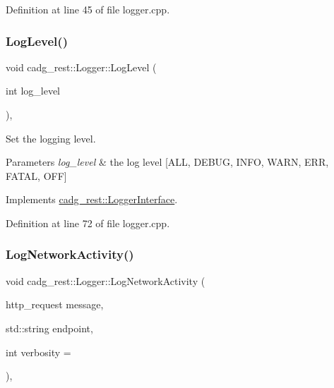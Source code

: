 Definition at line 45 of file logger.\+cpp.

\mbox{\label{classcadg__rest_1_1_logger_ae3bb452e78c2ceda9cdb0681f85af9e2}} 
\subsubsection{\texorpdfstring{LogLevel()}{LogLevel()}}
{\footnotesize\ttfamily void cadg\+\_\+rest\+::\+Logger\+::\+Log\+Level (\begin{DoxyParamCaption}\item[{int}]{log\+\_\+level }\end{DoxyParamCaption})\hspace{0.3cm}{\ttfamily [override]}, {\ttfamily [virtual]}}

Set the logging level. 
\begin{DoxyParams}{Parameters}
{\em log\+\_\+level} & the log level \mbox{[}A\+LL, D\+E\+B\+UG, I\+N\+FO, W\+A\+RN, E\+RR, F\+A\+T\+AL, O\+FF\mbox{]} \\
\hline
\end{DoxyParams}


Implements \mbox{\hyperlink{classcadg__rest_1_1_logger_interface_a9b1afaa12201781dc8c8cb782994db29}{cadg\+\_\+rest\+::\+Logger\+Interface}}.



Definition at line 72 of file logger.\+cpp.

\mbox{\label{classcadg__rest_1_1_logger_afb3fabc9999d6875709e8e58a7ef5e15}} 
\subsubsection{\texorpdfstring{LogNetworkActivity()}{LogNetworkActivity()}}
{\footnotesize\ttfamily void cadg\+\_\+rest\+::\+Logger\+::\+Log\+Network\+Activity (\begin{DoxyParamCaption}\item[{http\+\_\+request}]{message,  }\item[{std\+::string}]{endpoint,  }\item[{int}]{verbosity = {} }\end{DoxyParamCaption})\hspace{0.3cm}{\ttfamily [override]}, {\ttfamily [virtual]}}



